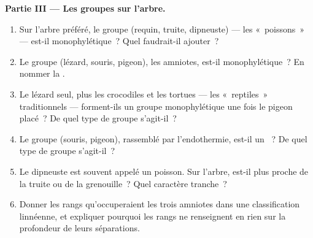 \begin{problem}
\medskip
\noindent\textbf{Partie III --- Les groupes sur l'arbre.}
\begin{enumerate}[resume]
  \item Sur l'arbre préféré, le groupe (requin, truite, dipneuste) ---
        les «~poissons~» --- est-il monophylétique~? Quel 
        faudrait-il ajouter~?
  \item Le groupe (lézard, souris, pigeon), les amniotes, est-il
        monophylétique~? En nommer la .
  \item Le lézard seul, plus les crocodiles et les tortues --- les
        «~reptiles~» traditionnels --- forment-ils un groupe
        monophylétique une fois le pigeon placé~? De quel type de
        groupe s'agit-il~?
  \item Le groupe (souris, pigeon), rassemblé par l'endothermie,
        est-il un ~? De quel type de groupe s'agit-il~?
  \item Le dipneuste est souvent appelé un poisson. Sur l'arbre,
        est-il plus proche de la truite ou de la grenouille~? Quel
        caractère tranche~?
  \item Donner les rangs qu'occuperaient les trois amniotes dans une
        classification linnéenne, et expliquer pourquoi les rangs ne
        renseignent en rien sur la profondeur de leurs séparations.
\end{enumerate}


\end{problem}

